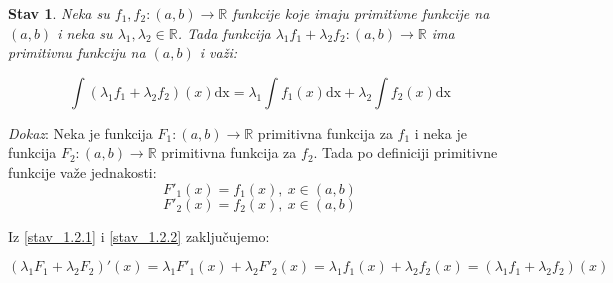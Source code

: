 \documentclass{article}
\newtheorem{stav}{Stav}[section]
\begin{document}
\begin{stavbox}
    \begin{stav}
        Neka su $f_1, f_2 : (a, b) \longrightarrow \mathbb{R}$
        funkcije koje imaju primitivne funkcije na $(a, b)$ i neka
        su $\lambda_1 , \lambda_2 \in \mathbb{R}$. Tada funkcija
        $\lambda_1 f_1 + \lambda_2 f_2 : (a, b) \longrightarrow
            \mathbb{R}$ ima primitivnu funkciju na $(a, b)$ i važi:\par
        $$\int (\lambda_1 f_1 + \lambda_2 f_2)(x)\text{dx} = \lambda_1\int
            f_1(x) \text{dx} + \lambda_2\int f_2(x) \text{dx}$$
    \end{stav}
\end{stavbox}
\setcounter{equation}{0}
\textit{Dokaz}: Neka je funkcija $F_1: (a, b) \longrightarrow \mathbb{R}$
primitivna funkcija za $f_1$ i neka je funkcija $F_2: (a, b)
    \longrightarrow \mathbb{R}$ primitivna funkcija za $f_2$.
Tada po definiciji primitivne funkcije važe jednakosti:
\begin{equation} \label{stav_1.2.1}
    F'_1(x) = f_1(x),\ x \in (a, b)
\end{equation}
\begin{equation} \label{stav_1.2.2}
    F'_2(x) = f_2(x),\ x \in (a, b)
\end{equation}

Iz \eqref{stav_1.2.1} i \eqref{stav_1.2.2} zaključujemo:

\begin{equation} \label{stav_1.2.3}
    (\lambda_1 F_1 + \lambda_2 F_2)'(x) =
    \lambda_1 F'_1(x) + \lambda_2 F'_2(x) =
    \lambda_1 f_1(x) + \lambda_2 f_2(x) =
    (\lambda_1 f_1 + \lambda_2 f_2)(x)
\end{equation}
\end{document}
